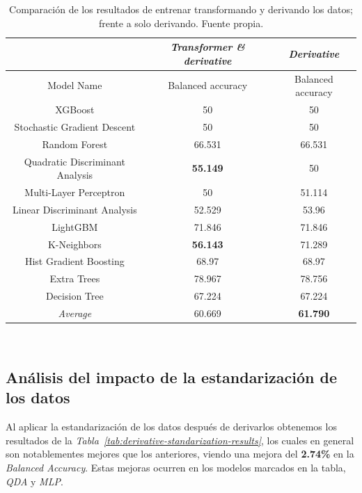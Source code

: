 \begin{table}[!h]
    \centering
    \begin{tabular}{|c|c|c|}
        \hline
            & \textit{Transformer \& derivative} & \textit{Derivative} \\ \hline
            Model Name & Balanced accuracy & Balanced accuracy \\ \hline
            XGBoost & 50 & 50 \\ 
            Stochastic Gradient Descent & 50 & 50 \\ 
            Random Forest & 66.531 & 66.531 \\ 
            Quadratic Discriminant Analysis & \textbf{55.149} & 50 \\ 
            Multi-Layer Perceptron & 50 & 51.114 \\ 
            Linear Discriminant Analysis & 52.529 & 53.96 \\ 
            LightGBM & 71.846 & 71.846 \\ 
            K-Neighbors & \textbf{56.143} & 71.289 \\ 
            Hist Gradient Boosting & 68.97 & 68.97 \\ 
            Extra Trees & 78.967 & 78.756 \\ 
            Decision Tree & 67.224 & 67.224 \\ \hline
            \textit{Average} & 60.669 & \textbf{61.790} \\ \hline
    \end{tabular}
    \caption{Comparación de los resultados de entrenar transformando y derivando los datos; frente a solo derivando. Fuente propia.}\ \label{tab:derivative-transformed-results}
\end{table}

\subsection{Análisis del impacto de la estandarización de los datos}

Al aplicar la estandarización de los datos después de derivarlos obtenemos los resultados de la \textit{Tabla\ \ref{tab:derivative-standarization-results}}, los cuales en general son notablementes mejores que los anteriores, viendo una mejora del \textbf{2.74\%} en la \textit{Balanced Accuracy}. Estas mejoras ocurren en los modelos marcados en la tabla, \textit{QDA} y \textit{MLP}.


